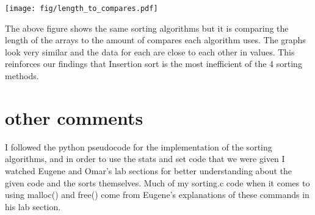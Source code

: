\documentclass[11pt]{article}
\begin{document}
\texttt{[image: fig/length\_to\_compares.pdf]}

The above figure shows the same sorting algorithms but it is comparing the length of the arrays to the amount of compares each algorithm uses. The graphs look very similar and the data for each are close to each other in values. This reinforces our findings that Insertion sort is the most inefficient of the 4 sorting methods.

\section{other comments}\label{ss:comments}
I followed the python pseudocode for the implementation of the sorting algorithms, and in order to use the stats and set code that we were given I watched Eugene and Omar's lab sections for better understanding about the given code and the sorts themselves. Much of my sorting.c code when it comes to using malloc() and free() come from Eugene's explanations of these commands in his lab section.
\end{document}
